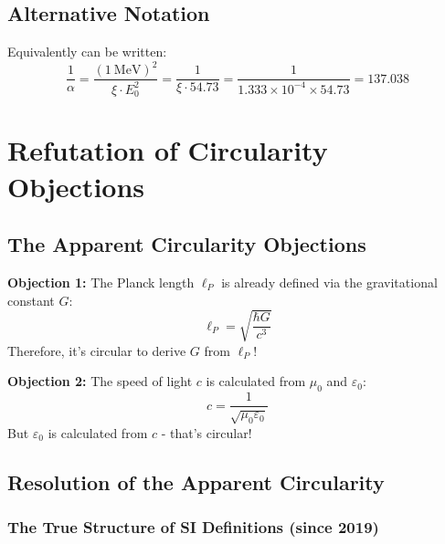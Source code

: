 	\subsection{Alternative Notation}
	
	Equivalently can be written:
	\begin{equation}
		\frac{1}{\alpha} = \frac{( \SI{1}{\MeV} )^2}{\xi \cdot E_0^2} = \frac{1}{\xi \cdot 54.73} = \frac{1}{1.333 \times 10^{-4} \times 54.73} = 137.038
	\end{equation}
	
	\section{Refutation of Circularity Objections}
	
	\subsection{The Apparent Circularity Objections}
	
	\begin{tcolorbox}[colback=red!10!white,colframe=red!75!black,title=Common Criticisms]
		\textbf{Objection 1:} The Planck length $\ell_P$ is already defined via the gravitational constant $G$:
		\begin{equation}
			\ell_P = \sqrt{\frac{\hbar G}{c^3}}
		\end{equation}
		Therefore, it's circular to derive $G$ from $\ell_P$!
		
		\textbf{Objection 2:} The speed of light $c$ is calculated from $\mu_0$ and $\varepsilon_0$:
		\begin{equation}
			c = \frac{1}{\sqrt{\mu_0 \varepsilon_0}}
		\end{equation}
		But $\varepsilon_0$ is calculated from $c$ - that's circular!
	\end{tcolorbox}
	
	\subsection{Resolution of the Apparent Circularity}
	
	\subsubsection{The True Structure of SI Definitions (since 2019)}
	
